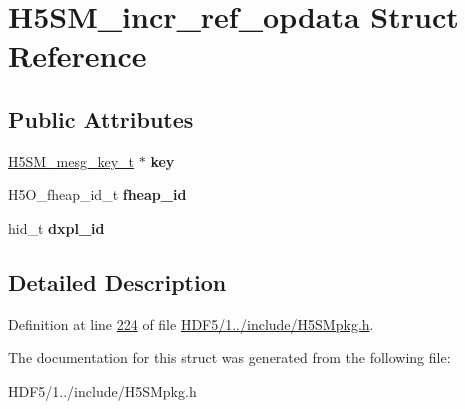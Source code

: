 \hypertarget{struct_h5_s_m__incr__ref__opdata}{}\section{H5\+S\+M\+\_\+incr\+\_\+ref\+\_\+opdata Struct Reference}
\label{struct_h5_s_m__incr__ref__opdata}
\subsection*{Public Attributes}
\begin{DoxyCompactItemize}
\item 
\mbox{\label{struct_h5_s_m__incr__ref__opdata_ae0c08f196bf95d8b28b7b3a598401fee}} 
\hyperlink{struct_h5_s_m__mesg__key__t}{H5\+S\+M\+\_\+mesg\+\_\+key\+\_\+t} $\ast$ {\bfseries key}
\item 
\mbox{\label{struct_h5_s_m__incr__ref__opdata_ab3be1d15677b7b82629a88ef4bd519f3}} 
H5\+O\+\_\+fheap\+\_\+id\+\_\+t {\bfseries fheap\+\_\+id}
\item 
\mbox{\label{struct_h5_s_m__incr__ref__opdata_a3bdcba8656bb2bd884b55713dd85809d}} 
hid\+\_\+t {\bfseries dxpl\+\_\+id}
\end{DoxyCompactItemize}


\subsection{Detailed Description}


Definition at line \hyperlink{_h_d_f5_21_810_81_2include_2_h5_s_mpkg_8h_source_l00224}{224} of file \hyperlink{_h_d_f5_21_810_81_2include_2_h5_s_mpkg_8h_source}{H\+D\+F5/1../include/\+H5\+S\+Mpkg.\+h}.



The documentation for this struct was generated from the following file\+:\begin{DoxyCompactItemize}
\item 
H\+D\+F5/1../include/\+H5\+S\+Mpkg.\+h\end{DoxyCompactItemize}
